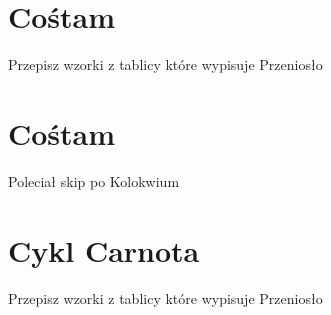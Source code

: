 \documentclass[12pt,a4paper]{report}
\newcommand{\com}[1]{{\color{red} #1}}
\newenvironment{lecture}[1]{\par\medskip
   \noindent\chapter{#1} \rmfamily}{\medskip}
\begin{document}
\begin{lecture}{Cośtam}
\com{Przepisz wzorki z tablicy które wypisuje Przeniosło}
\end{lecture}


\begin{lecture}{Cośtam}
\com{Poleciał skip po Kolokwium}
\end{lecture}


\begin{lecture}{Cykl Carnota}
\com{Przepisz wzorki z tablicy które wypisuje Przeniosło}
\end{lecture}

\end{document}

